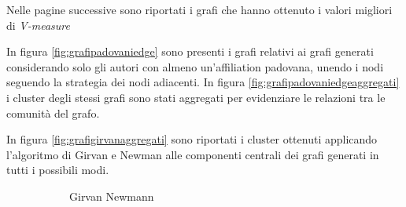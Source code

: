 \documentclass[12pt,a4paper,twoside]{report}
\begin{document}
Nelle pagine successive sono riportati i grafi che hanno ottenuto i valori migliori di
\textit{V-measure}

In figura \ref{fig:grafipadovaniedge} sono presenti i grafi relativi ai grafi generati considerando
solo gli autori con almeno un'affiliation padovana, unendo i nodi seguendo la strategia dei nodi
adiacenti. In figura \ref{fig:grafipadovaniedgeaggregati} i cluster degli stessi grafi sono stati
aggregati per evidenziare le relazioni tra le comunità del grafo.

In figura \ref{fig:grafigirvanaggregati} sono riportati i cluster ottenuti applicando l'algoritmo di
Girvan e Newman alle componenti centrali dei grafi generati in tutti i possibili modi.

\clearpage
\begin{figure}[ht]
    \centering
        \begin{subfigure}[b]{0.5\textwidth}
            \centering
            \setlength{\fboxrule}{0pt} %
            \caption{Girvan Newmann}
        \end{subfigure}%
        ~
        \begin{subfigure}[b]{0.5\textwidth}

\end{subfigure}
\end{figure}
\end{document}

